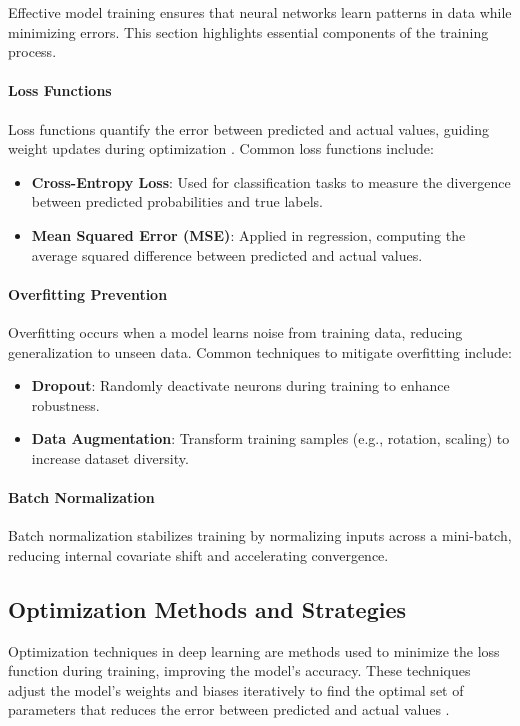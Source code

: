Effective model training ensures that neural networks learn patterns in data while minimizing errors. This section highlights essential components of the training process.

\paragraph{Loss Functions} 
Loss functions quantify the error between predicted and actual values, guiding weight updates during optimization \parencite{alzubaidi2021review}. Common loss functions include:
\begin{itemize}
    \item \textbf{Cross-Entropy Loss}: Used for classification tasks to measure the divergence between predicted probabilities and true labels.
    \item \textbf{Mean Squared Error (MSE)}: Applied in regression, computing the average squared difference between predicted and actual values.
\end{itemize}

\paragraph{Overfitting Prevention}
Overfitting occurs when a model learns noise from training data, reducing generalization to unseen data. Common techniques to mitigate overfitting include:
\begin{itemize}
    \item \textbf{Dropout}: Randomly deactivate neurons during training to enhance robustness.
    \item \textbf{Data Augmentation}: Transform training samples (e.g., rotation, scaling) to increase dataset diversity.
\end{itemize}

\paragraph{Batch Normalization}
Batch normalization stabilizes training by normalizing inputs across a mini-batch, reducing internal covariate shift and accelerating convergence.



\subsection{Optimization Methods and Strategies}
Optimization techniques in deep learning are methods used to minimize the loss function during training, improving the model’s accuracy. These techniques adjust the model's weights and biases iteratively to find the optimal set of parameters that reduces the error between predicted and actual values \parencite{alzubaidi2021review}.

